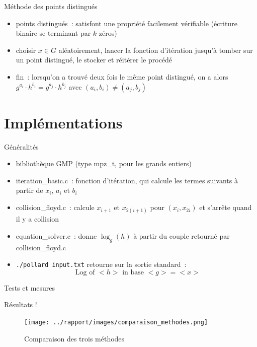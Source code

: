 \documentclass{beamer}
\begin{document}
  \begin{frame}{Méthode des points distingués}
    \begin{itemize}
        \item points distingués~: satisfont une propriété facilement vérifiable (écriture binaire se terminant par $k$ zéros)
        \item choisir $x \in G$ aléatoirement, lancer la fonction d'itération jusqu'à tomber sur un point distingué, le stocker et réitérer le procédé
        \item fin~: lorsqu'on a trouvé deux fois le même point distingué, on a alors $g^{a_i} \cdot h^{b_i} = g^{a_j} \cdot h^{b_j}$ avec $(a_i,b_i) \neq (a_j,b_j)$
    \end{itemize}
  \end{frame}


  \section{Implémentations}

  \begin{frame}{Généralités}
    \begin{itemize}
        \item bibliothèque GMP (type mpz\_t, pour les grands entiers)
        \item iteration\_basic.c~: fonction d'itération, qui calcule les termes suivants à partir de $x_i$, $a_i$ et $b_i$
        \item collision\_floyd.c~: calcule $x_{i+1}$ et $x_{2(i+1)}$ pour $(x_i,x_{2i})$ et s'arrête quand il y a collision
        \item equation\_solver.c~: donne $\log_g(h)$ à partir du couple retourné par collision\_floyd.c
        \item \texttt{./pollard input.txt} retourne sur la sortie standard~: 
        $$\text{\ Log of } <h> \text{\ in base } <g> = <x>$$
    \end{itemize}
  \end{frame}

  \begin{frame}{Tests et mesures}
  \end{frame}

  \begin{frame}{Résultats !}
    \begin{figure}
            \center{}
            \texttt{[image: ../rapport/images/comparaison\_methodes.png]}
            \caption{Comparaison des trois méthodes}
     \end{figure}
  \end{frame}
  
\end{document}
